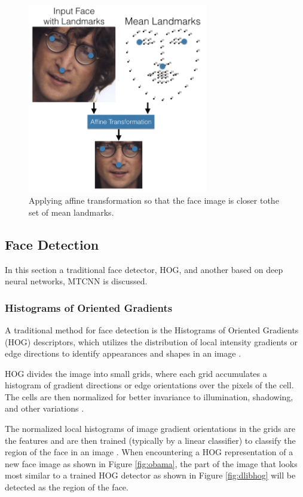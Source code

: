 \documentclass[12pt,english]{article}
\begin{document}
\begin{figure}[!tbp]
 \centering
    \includegraphics[width=0.7\textwidth]{figures/openface_detection.png}
    \caption{Applying affine transformation so that the face image is closer tothe set of mean landmarks. \cite{amos}}
	\label{fig:meanlandmark}
\end{figure}

\subsection{Face Detection}
\quad
In this section a traditional face detector, HOG, and another based on deep neural networks, MTCNN is discussed.

\subsubsection{Histograms of Oriented Gradients}
\quad
A traditional method for face detection is the Histograms of Oriented Gradients (HOG) descriptors, which utilizes the distribution of local intensity gradients or edge directions to identify appearances and shapes in an image \cite{dalal}. 

HOG divides the image into small grids, where each grid accumulates a histogram of gradient directions or edge orientations over the pixels of the cell. The cells are then normalized for better invariance to illumination, shadowing, and other variations \cite{dalal}. 

The normalized local histograms of image gradient orientations in the grids are the features and are then trained (typically by a linear classifier) to classify the region of the face in an image \cite{dalal}. When encountering a HOG representation of a new face image as shown in Figure \ref{fig:obama}, the part of the image that looks most similar to a trained HOG detector as shown in Figure \ref{fig:dlibhog} will be detected as the region of the face. 
\end{document}
